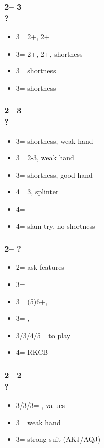 \subsubsection*{2\hearts -- 3\clubs\\
                ?}
\begin{itemize}
    \item 3\diams = 2+\clubs, 2+\diams
    \item 3\hearts = 2+\clubs, 2+\diams, \spades shortness
    \item 3\spades = \clubs shortness
    \item 3\nt = \diams shortness
\end{itemize}

\subsubsection*{2\hearts -- 3\diams\\
                ?}
\begin{itemize}
    \item 3\hearts = \spades shortness, weak hand
    \item 3\spades = 2-3\spades, weak hand
    \item 3\nt = \spades shortness, good hand
    \item 4\minor = 3\spades, splinter
    \item 4\hearts = \spades
    \item 4\spades = slam try, no shortness
\end{itemize}

\subsubsection*{2\spades -- ?}
\begin{itemize}
    \item 2\nt = ask \nt features
    \item 3\clubs = \lsf
    \item 3\diams = (5)6+\hearts, \invp \vimp
    \item 3\hearts = \minor, \gf
    \item 3\spades/3\nt/4\major/5\minor = to play
    \item 4\clubs = RKCB
\end{itemize}

\subsubsection*{2\spades -- 2\nt\\
                ?}
\begin{itemize}
    \item 3\clubs/3\diams/3\hearts = \nat, \nt values
    \item 3\spades = weak hand
    \item 3\nt = strong suit (AKJ/AQJ)
\end{itemize}

